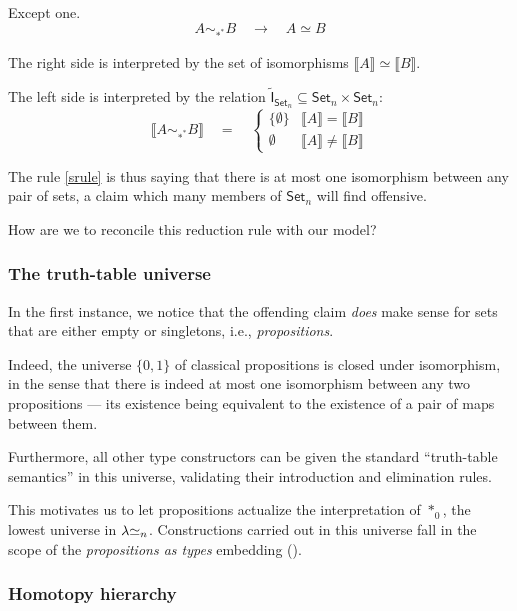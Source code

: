 \documentclass[10pt]{article}
\newcommand{\comment}[1]{}
\newcommand{\lRa}{\longrightarrow}
\newcommand{\sta}{*}
\newcommand{\setof}[1]{\{{#1}\}}
\newcommand{\semof}[1]{\llbracket{#1}\rrbracket}
\newcommand{\eq}{\quad=\quad}
\newcommand{\rrule}{\hspace{1em}\lRa\hspace{1em}}
\newcommand{\eeq}{\simeq}
\newcommand{\bset}{\mathsf{Set}}
\begin{document}
Except one.
\begin{equation}
 A \sim_{\sta^*} B \rrule A \eeq B \label{srule}
\end{equation}

The right side is interpreted by the set of isomorphisms $\semof{A}
\eeq \semof{B}$.

The left side is interpreted by the relation $\tilde{\mathsf{I}}_{\bset_n}
\subseteq \bset_n \times \bset_n$:
\[ \semof{A \sim_{\sta^*} B}
\eq \begin{cases}
\setof{\emptyset} & \semof{A} = \semof{B}\\
\emptyset &\semof{A} \neq \semof{B}
\end{cases} \]

The rule \eqref{srule}
is thus saying that there is at most one isomorphism between
any pair of sets, a claim which many members of $\bset_n$ will find offensive.

How are we to reconcile this reduction rule with our model?

\subsubsection{The truth-table universe}

In the first instance, we notice that the
offending claim \emph{does} make sense
for sets that are either empty or singletons, i.e., 
\emph{propositions}.

Indeed, the universe $\setof{0,1}$ of classical propositions is closed under
isomorphism, in the sense that there is indeed at most one isomorphism
between any two propositions --- its existence being equivalent to the
existence of a pair of maps between them.
 \comment{ (The relation $\tilde e$
induced by such an isomorphism $e$ 
relates all pairs of elements, and is equivalent to the
existence of functions from one set to the other and back.
(In particular, the identity relation on an empty or singleton set relates
all elements of that set.)}

Furthermore, all other type constructors can be given the standard
``truth-table semantics'' in this universe,
validating their introduction and elimination rules.

This motivates us to let propositions actualize the
interpretation of $\sta_0$, the lowest universe in $\leeqn$.
Constructions carried out in this universe fall in the scope
of the \emph{propositions as types} embedding (\cite{Howard80}).

\subsubsection{Homotopy hierarchy}
\end{document}
